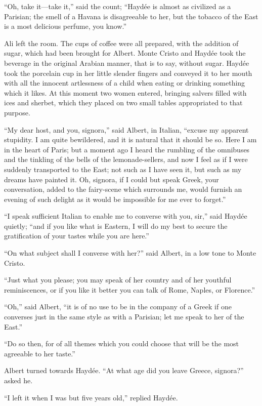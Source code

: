 “Oh, take it—take it,” said the count; “Haydée is almost as civilized
as a Parisian; the smell of a Havana is disagreeable to her, but the
tobacco of the East is a most delicious perfume, you know.”

Ali left the room. The cups of coffee were all prepared, with the
addition of sugar, which had been brought for Albert. Monte Cristo and
Haydée took the beverage in the original Arabian manner, that is to
say, without sugar. Haydée took the porcelain cup in her little slender
fingers and conveyed it to her mouth with all the innocent artlessness
of a child when eating or drinking something which it likes. At this
moment two women entered, bringing salvers filled with ices and
sherbet, which they placed on two small tables appropriated to that
purpose.

“My dear host, and you, signora,” said Albert, in Italian, “excuse my
apparent stupidity. I am quite bewildered, and it is natural that it
should be so. Here I am in the heart of Paris; but a moment ago I heard
the rumbling of the omnibuses and the tinkling of the bells of the
lemonade-sellers, and now I feel as if I were suddenly transported to
the East; not such as I have seen it, but such as my dreams have
painted it. Oh, signora, if I could but speak Greek, your conversation,
added to the fairy-scene which surrounds me, would furnish an evening
of such delight as it would be impossible for me ever to forget.”

“I speak sufficient Italian to enable me to converse with you, sir,”
said Haydée quietly; “and if you like what is Eastern, I will do my
best to secure the gratification of your tastes while you are here.”

“On what subject shall I converse with her?” said Albert, in a low tone
to Monte Cristo.

“Just what you please; you may speak of her country and of her youthful
reminiscences, or if you like it better you can talk of Rome, Naples,
or Florence.”

“Oh,” said Albert, “it is of no use to be in the company of a Greek if
one converses just in the same style as with a Parisian; let me speak
to her of the East.”

“Do so then, for of all themes which you could choose that will be the
most agreeable to her taste.”

Albert turned towards Haydée. “At what age did you leave Greece,
signora?” asked he.

“I left it when I was but five years old,” replied Haydée.

